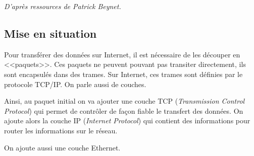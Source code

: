 \documentclass[10pt]{article}
\begin{document}

\begin{flushright}
\textit{D'après ressources de Patrick Beynet.}
\end{flushright}

 \renewcommand{\baselinestretch}{1.2}
\setlength{\parskip}{2ex plus 0.5ex minus 0.2ex}



\subsection*{Mise en situation}
Pour transférer des données sur Internet, il est nécessaire de les découper en <<paquets>>.
Ces paquets ne peuvent pouvant pas transiter directement, ils sont encapsulés dans des trames. Sur Internet, ces trames sont définies par le protocole TCP/IP. On parle aussi de couches.

Ainsi, au paquet initial on va ajouter une couche TCP (\textit{Transmission Control Protocol}) qui permet de contrôler de façon fiable le transfert des données. On ajoute alors la couche IP (\textit{Internet Protocol}) qui contient des informations pour router les informations sur le réseau.

On ajoute aussi une couche Ethernet.
\end{document}
